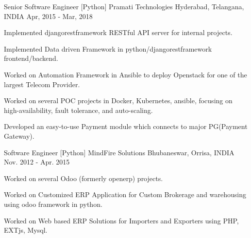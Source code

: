 \begin{cventries}
  \cventry
    {Senior Software Engineer [Python]} %
    {Pramati Technologies} %
    {Hyderabad, Telangana, INDIA} %
    {Apr, 2015 - Mar, 2018} %
    {
      \begin{cvitems} %
        \item {Implemented djangorestframework RESTful API server for internal projects.}
        \item {Implemented Data driven Framework in python/djangorestframework frontend/backend. }
        \item {Worked on Automation Framework in Ansible to deploy Openstack for one of the largest Telecom Provider. }
        \item {Worked on several POC projects in Docker, Kubernetes, ansible, focusing on high-availability, fault tolerance, and auto-scaling. }
        \item {Developed an easy-to-use Payment module which connects to major PG(Payment Gateway).}
      \end{cvitems}
    }

  \cventry
    {Software Engineer [Python]} %
    {MindFire Solutions} %
    {Bhubaneswar, Orrisa, INDIA} %
    {Nov. 2012 - Apr. 2015} %
    {
      \begin{cvitems} %
        \item {Worked on several Odoo (formerly openerp) projects.}
        \item {Worked on Customized ERP Application for Custom Brokerage and warehousing using odoo framework in python.}
        \item {Worked on Web based ERP Solutions for Importers and Exporters using PHP, EXTjs, Mysql.}
      \end{cvitems}
    }


\end{cventries}
